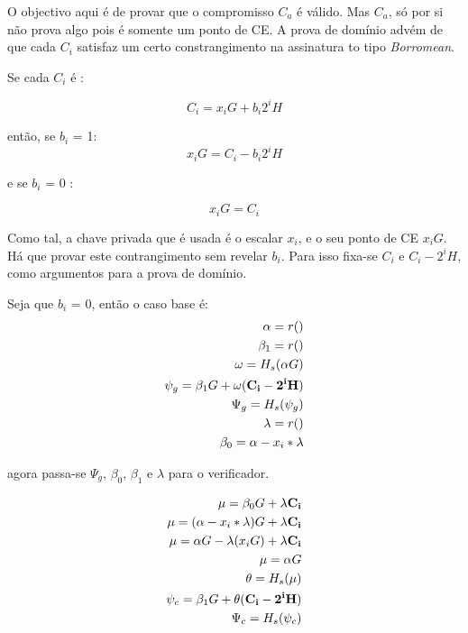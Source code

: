 O objectivo aqui é de provar que o compromisso $C_a$ é válido. Mas $C_a$, só por si não prova algo pois é somente um ponto de CE. A prova de domínio advém de que cada $C_i$ satisfaz um certo constrangimento na assinatura to tipo {\em Borromean}. 

Se cada $C_i$ é :

\vspace{.175cm}
\[C_{i} = x_i G + b_i 2^i H \]
\vspace{.175cm}

então, se $b_i$ = 1:
\vspace{.175cm}
\[x_i G = C_{i} - b_i 2^i H \]
\vspace{.175cm}

e se $b_i$ = 0 :

\vspace{.175cm}
\[x_i G = C_{i} \]
\vspace{.175cm}

Como tal, a chave privada que é usada é o escalar $x_i$, e o seu ponto de CE $x_i G$. 
Há que provar este contrangimento sem revelar $b_i$. 
\newpage
Para isso fixa-se $C_i$ e $C_i - 2^i H$, como argumentos para a prova de domínio.

Seja que $b_i$ = 0, então o caso base é:
\begin{align*}
\alpha=r()\\
\beta_1=r()\\
\omega = H_s(\alpha G)\\
\psi_g = \beta_1 G + \omega (\bold{C_i - 2^i H})\\
\Psi_g = H_s(\psi_g)\\
\lambda = r()\\
\beta_0=\alpha-x_i*\lambda\\
\end{align*}

agora passa-se $\Psi_g$, $\beta_0$, $\beta_1$ e $\lambda$ para o verificador.  

\begin{align*}
\mu=\beta_0 G + \lambda \bold{C_i}\\
\mu= (\alpha-x_i*\lambda) G + \lambda \bold{C_i}\\
\mu= \alpha G-\lambda (x_i G) + \lambda \bold{C_i}\\ 
\mu= \alpha G\\
\theta= H_s(\mu)\\
\psi_c = \beta_1 G + \theta (\bold{C_i - 2^i H})\\
\Psi_c = H_s(\psi_c)\\
\end{align*}

